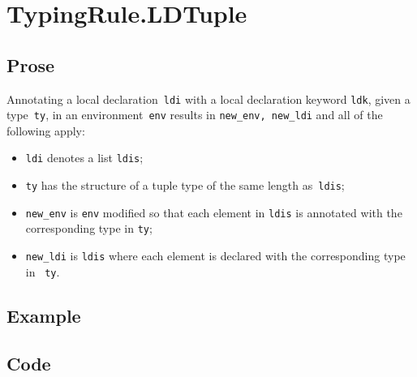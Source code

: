 \documentclass{book}
\begin{document}

\section{TypingRule.LDTuple\label{sec:TypingRule.LDTuple}}

  \subsection{Prose}
    Annotating a local declaration~\texttt{ldi} with a local declaration keyword \texttt{ldk}, given a type~\texttt{ty}, in
an environment~\texttt{env} results in \texttt{new\_env, new\_ldi} and all of
the following apply:
  \begin{itemize}
  \item \texttt{ldi} denotes a list \texttt{ldis};
  \item \texttt{ty} has the structure of a tuple type of the same length as~\texttt{ldis};
  \item \texttt{new\_env} is \texttt{env} modified so that each element in \texttt{ldis} is annotated with the corresponding type in \texttt{ty};
  \item \texttt{new\_ldi} is \texttt{ldis} where each element is declared with
the corresponding type in ~\texttt{ty}.
  \end{itemize}

  \subsection{Example}

  \subsection{Code}
\end{document}
